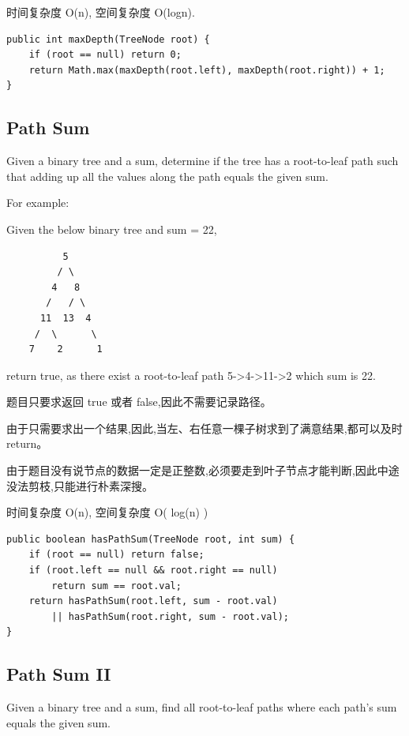 \documentclass[12pt]{book}
\begin{document}
时间复杂度 O(n), 空间复杂度 O(logn). 

\lstset{language=java,label= ,caption= ,numbers=none}
\begin{lstlisting}
public int maxDepth(TreeNode root) {
    if (root == null) return 0;
    return Math.max(maxDepth(root.left), maxDepth(root.right)) + 1;
}
\end{lstlisting}

\subsection{Path Sum}
\label{sec-4-5-3}
Given a binary tree and a sum, determine if the tree has a root-to-leaf path such that adding up all the values along the path equals the given sum.

For example:

Given the below binary tree and sum = 22,
\lstset{language=java,label= ,caption= ,numbers=none}
\begin{lstlisting}
          5
         / \
        4   8
       /   / \
      11  13  4
     /  \      \
    7    2      1
\end{lstlisting}

return true, as there exist a root-to-leaf path 5->4->11->2 which sum is 22.

题目只要求返回 true 或者 false,因此不需要记录路径。

由于只需要求出一个结果,因此,当左、右任意一棵子树求到了满意结果,都可以及时 return。

由于题目没有说节点的数据一定是正整数,必须要走到叶子节点才能判断,因此中途没法剪枝,只能进行朴素深搜。

时间复杂度 O(n), 空间复杂度 O( log(n) )

\lstset{language=java,label= ,caption= ,numbers=none}
\begin{lstlisting}
public boolean hasPathSum(TreeNode root, int sum) {
    if (root == null) return false;
    if (root.left == null && root.right == null)
        return sum == root.val;
    return hasPathSum(root.left, sum - root.val)
        || hasPathSum(root.right, sum - root.val);
}
\end{lstlisting}

\subsection{Path Sum II}
\label{sec-4-5-4}
Given a binary tree and a sum, find all root-to-leaf paths where each path's sum equals the given sum.
\end{document}
